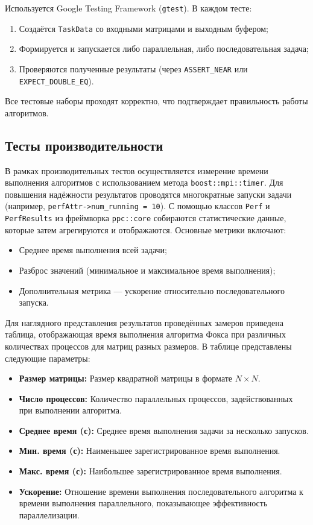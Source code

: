 \documentclass{report}
\begin{document}
Используется Google Testing Framework (\texttt{gtest}). В каждом тесте:

\begin{enumerate}
    \item Создаётся \texttt{TaskData} со входными матрицами и выходным буфером;
    \item Формируется и запускается либо параллельная, либо последовательная задача;
    \item Проверяются полученные результаты (через \texttt{ASSERT\_NEAR} или \texttt{EXPECT\_DOUBLE\_EQ}).
\end{enumerate}

Все тестовые наборы проходят корректно, что подтверждает правильность работы алгоритмов.

\subsection*{Тесты производительности}

В рамках производительных тестов осуществляется измерение времени выполнения алгоритмов с использованием метода \texttt{boost::mpi::timer}. Для повышения надёжности результатов проводятся многократные запуски задачи (например, \texttt{perfAttr->num\_running = 10}). С помощью классов \texttt{Perf} и \texttt{PerfResults} из фреймворка \texttt{ppc::core} собираются статистические данные, которые затем агрегируются и отображаются. Основные метрики включают:

\begin{itemize}
    \item Среднее время выполнения всей задачи;
    \item Разброс значений (минимальное и максимальное время выполнения);
    \item Дополнительная метрика — ускорение относительно последовательного запуска.
\end{itemize}

Для наглядного представления результатов проведённых замеров приведена таблица, отображающая время выполнения алгоритма Фокса при различных количествах процессов для матриц разных размеров. В таблице представлены следующие параметры:

\begin{itemize}
    \item \textbf{Размер матрицы:} Размер квадратной матрицы в формате $N \times N$.
    \item \textbf{Число процессов:} Количество параллельных процессов, задействованных при выполнении алгоритма.
    \item \textbf{Среднее время (с):} Среднее время выполнения задачи за несколько запусков.
    \item \textbf{Мин. время (с):} Наименьшее зарегистрированное время выполнения.
    \item \textbf{Макс. время (с):} Наибольшее зарегистрированное время выполнения.
    \item \textbf{Ускорение:} Отношение времени выполнения последовательного алгоритма к времени выполнения параллельного, показывающее эффективность параллелизации.
\end{itemize}
\end{document}
